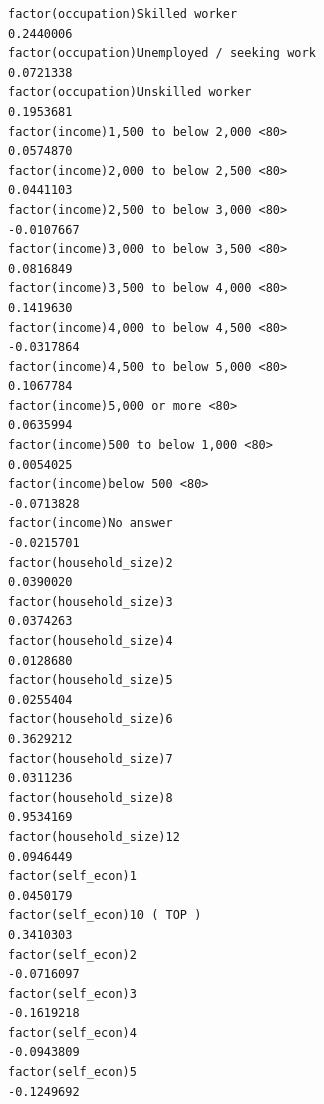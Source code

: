 \documentclass[
]{article}
\begin{document}
\begin{table}
\begin{minipage}[t]{\linewidth}
{\begin{verbatim}
factor(occupation)Skilled worker                                                   0.2440006
factor(occupation)Unemployed / seeking work                                        0.0721338
factor(occupation)Unskilled worker                                                 0.1953681
factor(income)1,500 to below 2,000 <80>                                            0.0574870
factor(income)2,000 to below 2,500 <80>                                            0.0441103
factor(income)2,500 to below 3,000 <80>                                           -0.0107667
factor(income)3,000 to below 3,500 <80>                                            0.0816849
factor(income)3,500 to below 4,000 <80>                                            0.1419630
factor(income)4,000 to below 4,500 <80>                                           -0.0317864
factor(income)4,500 to below 5,000 <80>                                            0.1067784
factor(income)5,000 or more <80>                                                   0.0635994
factor(income)500 to below 1,000 <80>                                              0.0054025
factor(income)below 500 <80>                                                      -0.0713828
factor(income)No answer                                                           -0.0215701
factor(household_size)2                                                            0.0390020
factor(household_size)3                                                            0.0374263
factor(household_size)4                                                            0.0128680
factor(household_size)5                                                            0.0255404
factor(household_size)6                                                            0.3629212
factor(household_size)7                                                            0.0311236
factor(household_size)8                                                            0.9534169
factor(household_size)12                                                           0.0946449
factor(self_econ)1                                                                 0.0450179
factor(self_econ)10 ( TOP )                                                        0.3410303
factor(self_econ)2                                                                -0.0716097
factor(self_econ)3                                                                -0.1619218
factor(self_econ)4                                                                -0.0943809
factor(self_econ)5                                                                -0.1249692

\end{verbatim}}
\end{minipage}
\end{table}
\end{document}
